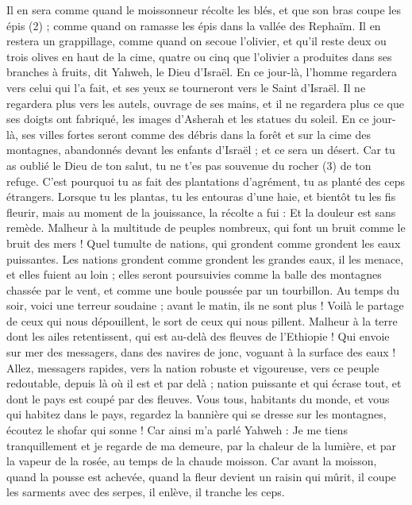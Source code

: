 \begin{multicols}{2}
{Il en sera comme quand le moissonneur récolte les blés, et que son bras coupe les épis (2) ; comme quand on ramasse les épis dans la vallée des Rephaïm.
Il en restera un grappillage, comme quand on secoue l'olivier, et qu'il reste deux ou trois olives en haut de la cime, quatre ou cinq que l'olivier a produites dans ses branches à fruits, dit Yahweh, le Dieu d'Israël.
En ce jour-là, l'homme regardera vers celui qui l’a fait, et ses yeux se tourneront vers le Saint d'Israël.
Il ne regardera plus vers les autels, ouvrage de ses mains, et il ne regardera plus ce que ses doigts ont fabriqué, les images d’Asherah et les statues du soleil.
En ce jour-là, ses villes fortes seront comme des débris dans la forêt et sur la cime des montagnes, abandonnés devant les enfants d'Israël ; et ce sera un désert.
Car tu as oublié le Dieu de ton salut, tu ne t'es pas souvenue du rocher (3) de ton refuge. C’est pourquoi tu as fait des plantations d’agrément, tu as planté des ceps étrangers.
Lorsque tu les plantas, tu les entouras d’une haie, et bientôt tu les fis fleurir, mais au moment de la jouissance, la récolte a fui : Et la douleur est sans remède.
Malheur à la multitude de peuples nombreux, qui font un bruit comme le bruit des mers ! Quel tumulte de nations, qui grondent comme grondent les eaux puissantes.
Les nations grondent comme grondent les grandes eaux, il les menace, et elles fuient au loin ; elles seront poursuivies comme la balle des montagnes chassée par le vent, et comme une boule poussée par un tourbillon.
Au temps du soir, voici une terreur soudaine ; avant le matin, ils ne sont plus ! Voilà le partage de ceux qui nous dépouillent, le sort de ceux qui nous pillent.
\VerseOne{}Malheur à la terre dont les ailes retentissent, qui est au-delà des fleuves de l’Ethiopie !
Qui envoie sur mer des messagers, dans des navires de jonc, voguant à la surface des eaux ! Allez, messagers rapides, vers la nation robuste et vigoureuse, vers ce peuple redoutable, depuis là où il est et par delà ; nation puissante et qui écrase tout, et dont le pays est coupé par des fleuves.
Vous tous, habitants du monde, et vous qui habitez dans le pays, regardez la bannière qui se dresse sur les montagnes, écoutez le shofar qui sonne !
Car ainsi m'a parlé Yahweh : Je me tiens tranquillement et je regarde de ma demeure, par la chaleur de la lumière, et par la vapeur de la rosée, au temps de la chaude moisson.
Car avant la moisson, quand la pousse est achevée, quand la fleur devient un raisin qui mûrit, il coupe les sarments avec des serpes, il enlève, il tranche les ceps.
}
\end{multicols}
